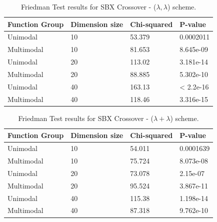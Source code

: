 \begin{table}[h]
	\centering
	\begin{tabular}{|l|l|l|l|}
		\hline
		\textbf{Function Group} & \textbf{Dimension size}      & \textbf{Chi-squared}        & \textbf{P-value}                     \\ \hline
		\multicolumn{1}{|l|}{Unimodal} & \multicolumn{1}{|l|}{10} & \multicolumn{1}{l|}{53.379} & \multicolumn{1}{l|}{0.0002011} \\ \hline
		\multicolumn{1}{|l|}{Multimodal} & \multicolumn{1}{|l|}{10} & \multicolumn{1}{l|}{81.653} & \multicolumn{1}{l|}{8.645e-09}  \\ \hline
		\hline
		\multicolumn{1}{|l|}{Unimodal} & \multicolumn{1}{|l|}{20} & \multicolumn{1}{l|}{113.02} & \multicolumn{1}{l|}{3.181e-14} \\ \hline
		\multicolumn{1}{|l|}{Multimodal} & \multicolumn{1}{|l|}{20} & \multicolumn{1}{l|}{88.885} & \multicolumn{1}{l|}{5.302e-10}  \\ \hline
		\hline
		\multicolumn{1}{|l|}{Unimodal} & \multicolumn{1}{|l|}{40} & \multicolumn{1}{l|}{163.13} & \multicolumn{1}{l|}{< 2.2e-16} \\ \hline
		\multicolumn{1}{|l|}{Multimodal} & \multicolumn{1}{|l|}{40} & \multicolumn{1}{l|}{118.46} & \multicolumn{1}{l|}{3.316e-15}  \\ \hline
	\end{tabular}
	\caption{Friedman Test results for SBX Crossover - ($\lambda, \lambda$) scheme.}
	\label{Friedman_test_sbx-a}	
\end{table}

	

\begin{table}[h]
	\centering
	\begin{tabular}{|l|l|l|l|}
		\hline
		\textbf{Function Group} & \textbf{Dimension size}      & \textbf{Chi-squared}        & \textbf{P-value}                     \\ \hline
		\multicolumn{1}{|l|}{Unimodal} & \multicolumn{1}{|l|}{10} & \multicolumn{1}{l|}{54.011} & \multicolumn{1}{l|}{0.0001639} \\ \hline
		\multicolumn{1}{|l|}{Multimodal} & \multicolumn{1}{|l|}{10} & \multicolumn{1}{l|}{75.724} & \multicolumn{1}{l|}{8.073e-08}  \\ \hline
		\hline
		\multicolumn{1}{|l|}{Unimodal} & \multicolumn{1}{|l|}{20} & \multicolumn{1}{l|}{73.078} & \multicolumn{1}{l|}{2.15e-07} \\ \hline
		\multicolumn{1}{|l|}{Multimodal} & \multicolumn{1}{|l|}{20} & \multicolumn{1}{l|}{95.524} & \multicolumn{1}{l|}{3.867e-11}  \\ \hline
		\hline
		\multicolumn{1}{|l|}{Unimodal} & \multicolumn{1}{|l|}{40} & \multicolumn{1}{l|}{115.38} & \multicolumn{1}{l|}{1.198e-14} \\ \hline
		\multicolumn{1}{|l|}{Multimodal} & \multicolumn{1}{|l|}{40} & \multicolumn{1}{l|}{87.318} & \multicolumn{1}{l|}{9.762e-10}  \\ \hline
	\end{tabular}
	\caption{Friedman Test results for SBX Crossover - ($\lambda + \lambda$) scheme.}
	\label{Friedman_test_sbx-b}	
\end{table}



